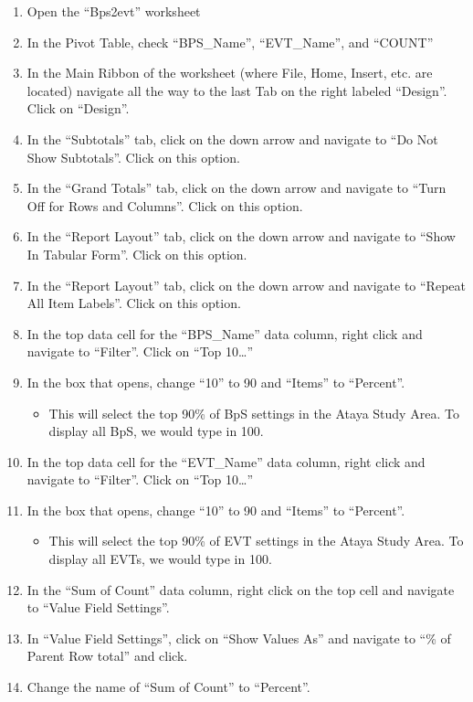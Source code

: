 \documentclass[
]{book}
\providecommand{\tightlist}{%
  \setlength{\itemsep}{0pt}\setlength{\parskip}{0pt}}
\begin{document}
\begin{enumerate}
\def\labelenumi{\arabic{enumi}.}
\tightlist
\item
  Open the ``Bps2evt'' worksheet
\item
  In the Pivot Table, check ``BPS\_Name'', ``EVT\_Name'', and ``COUNT''
\item
  In the Main Ribbon of the worksheet (where File, Home, Insert, etc. are located) navigate all the way to the last Tab on the right labeled ``Design''. Click on ``Design''.
\item
  In the ``Subtotals'' tab, click on the down arrow and navigate to ``Do Not Show Subtotals''. Click on this option.
\item
  In the ``Grand Totals'' tab, click on the down arrow and navigate to ``Turn Off for Rows and Columns''. Click on this option.
\item
  In the ``Report Layout'' tab, click on the down arrow and navigate to ``Show In Tabular Form''. Click on this option.
\item
  In the ``Report Layout'' tab, click on the down arrow and navigate to ``Repeat All Item Labels''. Click on this option.
\item
  In the top data cell for the ``BPS\_Name'' data column, right click and navigate to ``Filter''. Click on ``Top 10\ldots{}''
\item
  In the box that opens, change ``10'' to 90 and ``Items'' to ``Percent''.

  \begin{itemize}
  \tightlist
  \item
    This will select the top 90\% of BpS settings in the Ataya Study Area. To display all BpS, we would type in 100.
  \end{itemize}
\item
  In the top data cell for the ``EVT\_Name'' data column, right click and navigate to ``Filter''. Click on ``Top 10\ldots{}''
\item
  In the box that opens, change ``10'' to 90 and ``Items'' to ``Percent''.

  \begin{itemize}
  \tightlist
  \item
    This will select the top 90\% of EVT settings in the Ataya Study Area. To display all EVTs, we would type in 100.
  \end{itemize}
\item
  In the ``Sum of Count'' data column, right click on the top cell and navigate to ``Value Field Settings''.
\item
  In ``Value Field Settings'', click on ``Show Values As'' and navigate to ``\% of Parent Row total'' and click.
\item
  Change the name of ``Sum of Count'' to ``Percent''.
\end{enumerate}
\end{document}
